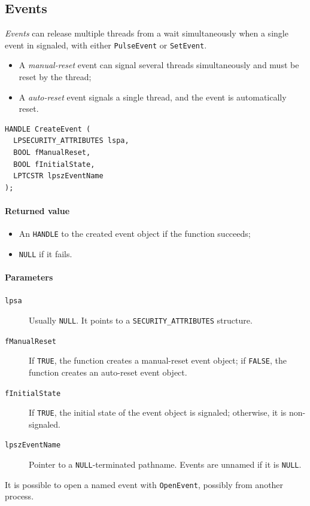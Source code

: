 \subsection{Events}
\emph{Events} can release multiple threads from a wait simultaneously when a single event in signaled, with either \texttt{PulseEvent} or \texttt{SetEvent}.

\begin{itemize}
\item A \emph{manual-reset} event can signal several threads simultaneously and must be reset by the thread;
\item A \emph{auto-reset} event signals a single thread, and the event is automatically reset.
\end{itemize}

\begin{verbatim}
HANDLE CreateEvent (
  LPSECURITY_ATTRIBUTES lspa,
  BOOL fManualReset,
  BOOL fInitialState,
  LPTCSTR lpszEventName
);
\end{verbatim}

\paragraph{Returned value}
\begin{itemize}
\item An \texttt{HANDLE} to the created event object if the function succeeds;
\item \texttt{NULL} if it fails.
\end{itemize}

\paragraph{Parameters}
\begin{description}
\item [\texttt{lpsa}] Usually \texttt{NULL}. It points to a \texttt{SECURITY\_ATTRIBUTES} structure.
\item [\texttt{fManualReset}] If \texttt{TRUE}, the function creates a manual-reset event object; if \texttt{FALSE}, the function creates an auto-reset event object.
\item [\texttt{fInitialState}] If \texttt{TRUE}, the initial state of the event object is signaled; otherwise, it is non-signaled.
\item [\texttt{lpszEventName}] Pointer to a \texttt{NULL}-terminated pathname. Events are unnamed if it is \texttt{NULL}.
\end{description}
It is possible to open a named event with \texttt{OpenEvent}, possibly from another process.

